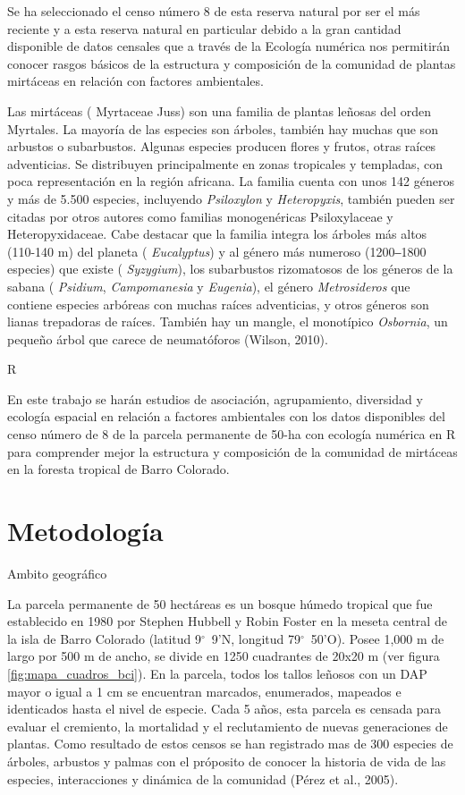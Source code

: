 \documentclass[11pt,]{article}
\begin{document}
Se ha seleccionado el censo número 8 de esta reserva natural por ser el
más reciente y a esta reserva natural en particular debido a la gran
cantidad disponible de datos censales que a través de la Ecología
numérica nos permitirán conocer rasgos básicos de la estructura y
composición de la comunidad de plantas mirtáceas en relación con
factores ambientales.

Las mirtáceas ( Myrtaceae Juss) son una familia de plantas leñosas del
orden Myrtales. La mayoría de las especies son árboles, también hay
muchas que son arbustos o subarbustos. Algunas especies producen flores
y frutos, otras raíces adventicias. Se distribuyen principalmente en
zonas tropicales y templadas, con poca representación en la región
africana. La familia cuenta con unos 142 géneros y más de 5.500
especies, incluyendo \emph{Psiloxylon} y \emph{Heteropyxis}, también
pueden ser citadas por otros autores como familias monogenéricas
Psiloxylaceae y Heteropyxidaceae. Cabe destacar que la familia integra
los árboles más altos (110-140 m) del planeta ( \emph{Eucalyptus}) y al
género más numeroso (1200‒1800 especies) que existe ( \emph{Syzygium}),
los subarbustos rizomatosos de los géneros de la sabana (
\emph{Psidium}, \emph{Campomanesia} y \emph{Eugenia}), el género
\emph{Metrosideros} que contiene especies arbóreas con muchas raíces
adventicias, y otros géneros son lianas trepadoras de raíces. También
hay un mangle, el monotípico \emph{Osbornia}, un pequeño árbol que
carece de neumatóforos (Wilson, 2010).

R

En este trabajo se harán estudios de asociación, agrupamiento,
diversidad y ecología espacial en relación a factores ambientales con
los datos disponibles del censo número de 8 de la parcela permanente de
50-ha con ecología numérica en R para comprender mejor la estructura y
composición de la comunidad de mirtáceas en la foresta tropical de Barro
Colorado.

\section{Metodología}\label{metodologuxeda}

Ambito geográfico

La parcela permanente de 50 hectáreas es un bosque húmedo tropical que
fue establecido en 1980 por Stephen Hubbell y Robin Foster en la meseta
central de la isla de Barro Colorado (latitud 9\(^\circ\)~9'N, longitud
79\(^\circ\)~50'O). Posee 1,000 m de largo por 500 m de ancho, se divide
en 1250 cuadrantes de 20x20 m (ver figura \ref{fig:mapa_cuadros_bci}).
En la parcela, todos los tallos leñosos con un DAP mayor o igual a 1 cm
se encuentran marcados, enumerados, mapeados e identicados hasta el
nivel de especie. Cada 5 años, esta parcela es censada para evaluar el
cremiento, la mortalidad y el reclutamiento de nuevas generaciones de
plantas. Como resultado de estos censos se han registrado mas de 300
especies de árboles, arbustos y palmas con el próposito de conocer la
historia de vida de las especies, interacciones y dinámica de la
comunidad (Pérez et al., 2005).
\end{document}
